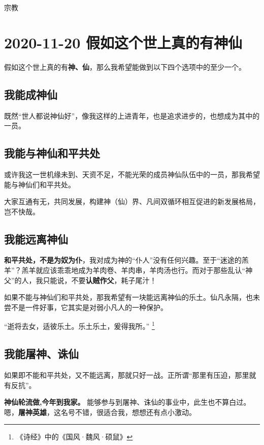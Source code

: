 \begin{taged}{宗教}
\section{2020-11-20 假如这个世上真的有神仙}
\end{taged}

假如这个世上真的有\textbf{神、仙}，那么我希望能做到以下四个选项中的至少一个。

\subsection{我能成神仙}

既然“世人都说神仙好”，像我这样的上进青年，也是追求进步的，也想成为其中的一员。

\subsection{我能与神仙和平共处}

或许我这一世机缘未到、天资不足，不能光荣的成员神仙队伍中的一员，那我希望能与神仙们和平共处。

大家互通有无，共同发展，构建神（仙）界、凡间双循环相互促进的新发展格局，岂不快哉。

\subsection{我能远离神仙}

\textbf{和平共处，不是为奴为仆}，我对成为神的“仆人”没有任何兴趣。至于“迷途的羔羊”？羔羊就应该乖乖地成为羊肉卷、羊肉串，羊肉汤也行。而对于那些乱认“神父”的人，我只能说，不要\textbf{\color{red}认贼作父}，耗子尾汁！

如果不能与神仙们和平共处，那我希望有一块能远离神仙的乐土。仙凡永隔，也未尝不是一件好事，它其实是对弱小凡人的一种保护。

“逝将去女，适彼乐土。乐土乐土，爰得我所。” \footnote{《诗经》中的《国风·魏风·硕鼠》}

\subsection{我能屠神、诛仙}

如果即不能和平共处，又不能远离，那就只好一战。正所谓“那里有压迫，那里就有反抗”。

\textbf{神仙轮流做,今年到我家。} 能够参与到屠神、诛仙的事业中，此生也不算白过。嗯，\textbf{屠神英雄}，这名号不错，很适合我，想想还有点小激动。

